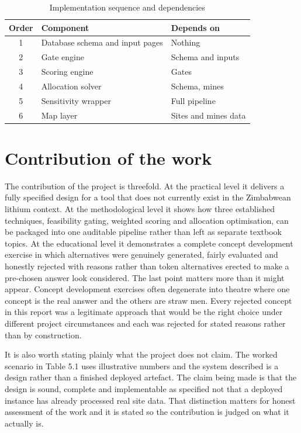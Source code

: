 \documentclass[12pt,a4paper]{report}
\begin{document}
\begin{table}[h]
\centering
\caption{Implementation sequence and dependencies}
\begin{tabular}{clp{6.4cm}}
\toprule
Order & Component & Depends on \\
\midrule
1 & Database schema and input pages & Nothing \\
2 & Gate engine & Schema and inputs \\
3 & Scoring engine & Gates \\
4 & Allocation solver & Schema, mines \\
5 & Sensitivity wrapper & Full pipeline \\
6 & Map layer & Sites and mines data \\
\bottomrule
\end{tabular}
\end{table}

\section{Contribution of the work}
The contribution of the project is threefold. At the practical level
it delivers a fully specified design for a tool that does not
currently exist in the Zimbabwean lithium context. At the
methodological level it shows how three established techniques,
feasibility gating, weighted scoring and allocation optimisation, can
be packaged into one auditable pipeline rather than left as separate
textbook topics. At the educational level it demonstrates a complete
concept development exercise in which alternatives were genuinely
generated, fairly evaluated and honestly rejected with reasons rather
than token alternatives erected to make a pre-chosen answer look
considered. The last point matters more than it might appear. Concept
development exercises often degenerate into theatre where one concept
is the real answer and the others are straw men. Every rejected
concept in this report was a legitimate approach that would be the
right choice under different project circumstances and each was
rejected for stated reasons rather than by construction.

It is also worth stating plainly what the project does not claim. The
worked scenario in Table 5.1 uses illustrative numbers and the system
described is a design rather than a finished deployed artefact. The
claim being made is that the design is sound, complete and implementable
as specified not that a deployed instance has already processed real
site data. That distinction matters for honest assessment of the work
and it is stated so the contribution is judged on what it actually is.
\end{document}
